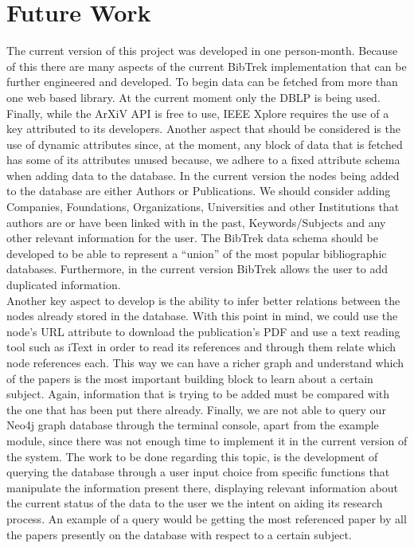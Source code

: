 \documentclass[twocolumn]{article}
\begin{document}
\section{Future Work}
The current version of this project was developed in one person-month. Because of this there are many aspects of the current BibTrek implementation that can be further engineered and developed. To begin data can be fetched from more than one web based library. At the current moment only the DBLP is being used. Finally, while the ArXiV API is free to use, IEEE Xplore requires the use of a key attributed to its developers. Another aspect that should be considered is the use of dynamic attributes since, at the moment, any block of data that is fetched has some of its attributes unused because, we adhere to a fixed attribute schema when adding data to the database. In the current version the nodes being added to the database are either Authors or Publications. We should consider adding Companies, Foundations, Organizations, Universities and other Institutions that authors are or have been linked with in the past, Keywords/Subjects and any other relevant information for the user. The BibTrek data schema should be developed to be able to represent a ``union'' of the most popular bibliographic databases. Furthermore, in the current version BibTrek allows the user to add duplicated information. \\[1\baselineskip]
Another key aspect to develop is the ability to infer better relations between the nodes already stored in the database. With this point in mind, we could use the node's URL attribute to download the publication's PDF and use a text reading tool such as iText in order to read its references and through them relate which node references each. This way we can have a richer graph and understand which of the papers is the most important building block to learn about a certain subject. Again, information that is trying to be added must be compared with the one that has been put there already. Finally, we are not able to query our Neo4j graph database through the terminal console, apart from the example module, since there was not enough time to implement it in the current version of the system. The work to be done regarding this topic, is the development of querying the database through a user input choice from specific functions that manipulate the information present there, displaying relevant information about the current status of the data to the user we the intent on aiding its research process. An example of a query would be getting the most referenced paper by all the papers presently on the database with respect to a certain subject.
\end{document}

